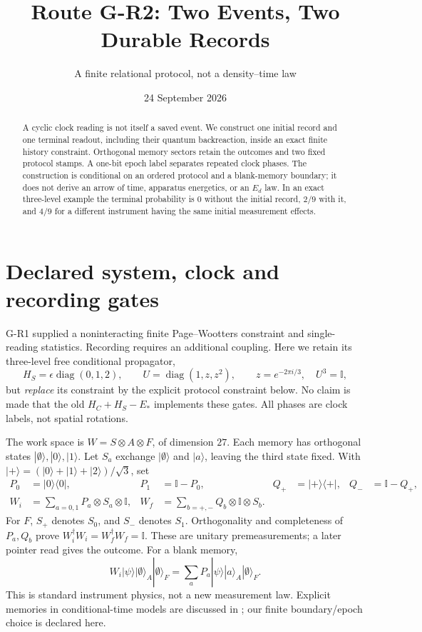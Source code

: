 \documentclass[11pt,a4paper]{article}
\title{Route G-R2: Two Events, Two Durable Records}
\author{A finite relational protocol, not a density--time law}
\date{24 September 2026}
\newcommand{\id}{\mathbb I}
\newcommand{\ket}[1]{|#1\rangle}
\newcommand{\bra}[1]{\langle#1|}
\newcommand{\pr}[1]{\ket{#1}\bra{#1}}
\begin{document}
\maketitle
\begin{abstract}
A cyclic clock reading is not itself a saved event. We construct one
initial record and one terminal readout, including their quantum
backreaction, inside an exact finite history constraint. Orthogonal
memory sectors retain the outcomes and two fixed protocol stamps.
A one-bit epoch label separates repeated clock phases. The construction
is conditional on an ordered protocol and a blank-memory boundary; it
does not derive an arrow of time, apparatus energetics, or an $E_d$
law. In an exact three-level example the terminal probability is $0$
without the initial record, $2/9$ with it, and $4/9$ for a different
instrument having the same initial measurement effects.
\end{abstract}

\section{Declared system, clock and recording gates}
G-R1 supplied a noninteracting finite Page--Wootters constraint and
single-reading statistics. Recording requires an additional coupling.
Here we retain its three-level free conditional propagator,
\begin{equation}
 H_S=\epsilon\operatorname{diag}(0,1,2),\qquad
 U=\operatorname{diag}(1,z,z^2),\qquad z=e^{-2\pi i/3},\quad U^3=\id ,
\end{equation}
but \emph{replace} its constraint by the explicit protocol constraint
below. No claim is made that the old $H_C+H_S-E_*$ implements these gates.
All phases are clock labels, not spatial rotations.

The work space is $W=S\otimes A\otimes F$, of dimension $27$.
Each memory has orthogonal states $\ket{\emptyset},\ket0,\ket1$.
Let $S_a$ exchange $\ket{\emptyset}$ and $\ket a$, leaving the third
state fixed. With $\ket+=(\ket0+\ket1+\ket2)/\sqrt3$, set
\begin{align}
 P_0&=\pr0,& P_1&=\id-P_0,&
 Q_+&=\pr+,& Q_-&=\id-Q_+ ,\\
 W_i&=\sum_{a=0,1}P_a\otimes S_a\otimes\id,&
 W_f&=\sum_{b=+,-}Q_b\otimes\id\otimes S_b .
\end{align}
For $F$, $S_+$ denotes $S_0$, and $S_-$ denotes $S_1$.
Orthogonality and completeness of $P_a,Q_b$ prove
$W_i^\dagger W_i=W_f^\dagger W_f=\id$. These are unitary
premeasurements; a later pointer read gives the outcome.
For a blank memory,
\begin{equation}
 W_i\ket\psi\ket\emptyset_A\ket\emptyset_F
 =\sum_a P_a\ket\psi\ket a_A\ket\emptyset_F .
\end{equation}
This is standard instrument physics, not a new measurement law.
Explicit memories in conditional-time models are discussed in
\cite{quantumtime}; our finite boundary/epoch choice is declared here.
\end{document}
